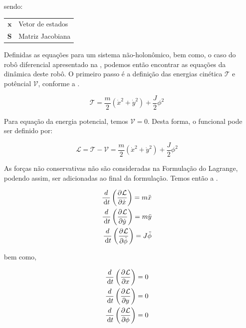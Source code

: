 \noindent sendo:
\begin{center}
    \begin{tabular}{ r | l }
        $\mathbf{x}$ & Vetor de estados \\
        $\mathbf{S}$ & Matriz Jacobiana \\
    \end{tabular}
\end{center}

Definidas as equações para um sistema não-holonômico, bem como, o caso do robô diferencial apresentado na , podemos então encontrar as equações da dinâmica deste robô. O primeiro passo é a definição das energias cinética $\mathcal{T}$ e potêncial $\mathcal{V}$, conforme a .

\begin{equation}
    \mathcal{T} = \frac{m}{2}\left(\dot{x}^2+\dot{y}^2\right)+ \frac{J}{2}\phi^2
    \label{eq:diffcardin}
\end{equation}

Para equação da energia potencial, temos $\mathcal{V} = 0$. Desta forma, o funcional pode ser definido por:

\begin{equation}
    \mathcal{L} = \mathcal{T} - \mathcal{V} = \frac{m}{2}\left(\dot{x}^2+\dot{y}^2\right)+ \frac{J}{2}\phi^2
    \label{eq:diffcardin2}
\end{equation}

As forças não conservativas não são consideradas na Formulação do Lagrange, podendo assim, ser adicionadas ao final da formulação. Temos então a .

\begin{equation}
    \begin{split}
        \frac{d}{\df{t}}\left( \parcial{}{\mathcal{L}}{\dot{x}}\right) = m\ddot{x} \\
        \frac{d}{\df{t}}\left( \parcial{}{\mathcal{L}}{\dot{y}}\right) = m\ddot{y} \\
        \frac{d}{\df{t}}\left( \parcial{}{\mathcal{L}}{\dot{\phi}}\right) = J\ddot{\phi} 
    \end{split}
    \label{eq:diffcardin3}
\end{equation}

\noindent bem como,

\begin{equation}
    \begin{split}
        \frac{d}{\df{t}}\left( \parcial{}{\mathcal{L}}{x}\right) = 0 \\
        \frac{d}{\df{t}}\left( \parcial{}{\mathcal{L}}{y}\right) = 0 \\
        \frac{d}{\df{t}}\left( \parcial{}{\mathcal{L}}{\phi}\right) = 0
    \end{split}
    \label{eq:diffcardin4}
\end{equation}


